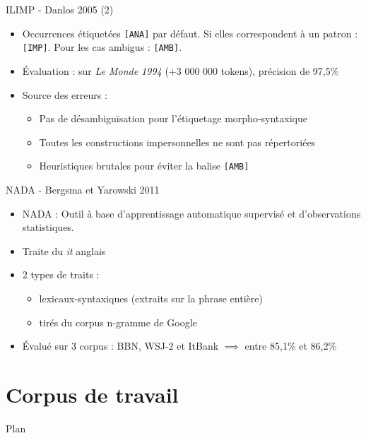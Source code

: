\documentclass{beamer}
\begin{document}
\begin{frame}{ILIMP - Danlos 2005 (2)}
\begin{itemize}
  \item Occurrences étiquetées \verb![ANA]! par défaut. Si elles correspondent à un patron : \verb![IMP]!. Pour les cas ambigus : \verb![AMB]!.
  \item Évaluation : sur \textit{Le Monde 1994} (+3 000 000 tokens), précision de 97,5\%
  \item Source des erreurs :
  \begin{itemize}
    \item Pas de désambiguïsation pour l'étiquetage morpho-syntaxique
    \item Toutes les constructions impersonnelles ne sont pas répertoriées
    \item Heuristiques brutales pour éviter la balise \verb![AMB]!
  \end{itemize}
\end{itemize}
\end{frame}

\begin{frame}{NADA - Bergsma et Yarowski 2011}
\begin{itemize}
  \item NADA : Outil à base d'apprentissage automatique supervisé et d'observations statistiques.
  \item Traite du \og \textit{it} \fg{} anglais
  \item 2 types de traits : 
  \begin{itemize}
    \item lexicaux-syntaxiques (extraits sur la phrase entière)
    \item tirés du corpus n-gramme de Google
  \end{itemize}
  \item Évalué sur 3 corpus : BBN, WSJ-2 et ItBank $\implies$ entre 85,1\% et 86,2\%
\end{itemize}
\end{frame}


\section{Corpus de travail}

\begin{frame}{Plan}
  \tableofcontents[currentsection]
\end{frame}
\end{document}
